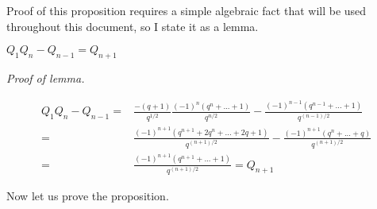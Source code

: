 \documentclass{amsart}
\begin{document}
Proof of this proposition requires a simple algebraic fact that will be used throughout this document, so I state it as a lemma.

\begin{lemma}
	$Q_1Q_n-Q_{n-1}=Q_{n+1}$
	
	\label{Q alg}
\end{lemma}

\textit{Proof of lemma.}

\begin{align*}
Q_1Q_n-Q_{n-1}=&\frac{-(q+1)}{q^{1/2}}\frac{(-1)^n(q^n+...+1)}{q^{n/2}}-\frac{(-1)^{n-1}(q^{n-1}+...+1)}{q^{(n-1)/2}}\\
=&\frac{(-1)^{n+1}(q^{n+1}+2q^n+...+2q+1)}{q^{(n+1)/2}}-\frac{(-1)^{n+1}(q^n+...+q)}{q^{(n+1)/2}}\\
=&\frac{(-1)^{n+1}(q^{n+1}+...+1)}{q^{(n+1)/2}}=Q_{n+1}
\end{align*}

Now let us prove the proposition.
\end{document}
